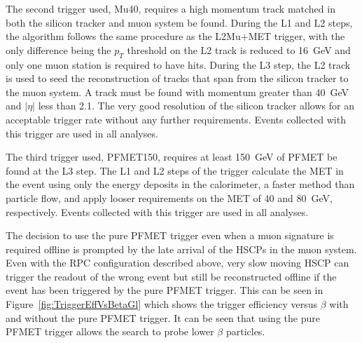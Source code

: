 The second trigger used, Mu40, requires a high momentum track matched in both the silicon tracker and muon system be found.
During the L1 and L2 steps, the algorithm follows the same procedure as the L2Mu+MET trigger, with the only difference being the $p_T$ threshold on the L2 track
is reduced to 16~GeV and only one muon station is required to have hits.
During the L3 step, the L2 track is used to seed the reconstruction of tracks that span from the silicon tracker to the muon system.
A track must be found with momentum greater than 40~GeV and $|\eta|$ less than 2.1. The very good resolution of the silicon tracker allows for an acceptable trigger rate
without any further requirements. Events collected with this trigger are used in all analyses.

The third trigger used, PFMET150, requires at least 150~GeV of PFMET be found at the L3 step. The L1 and L2 steps of the trigger calculate the MET in the event using
only the energy deposits in the calorimeter, a faster method than particle flow, and apply looser requirements on the MET of 40 and 80~GeV, respectively.
Events collected with this trigger are used in all analyses.

The decision to use the pure PFMET trigger even when a muon signature is required offline is prompted by the late arrival of the HSCPs in the muon system.
Even with the RPC configuration described above, very slow moving HSCP can trigger the readout of the wrong event but still be reconstructed offline
if the event has been triggered by the pure PFMET trigger. This can be seen in Figure~\ref{fig:TriggerEffVsBetaGl} which shows the trigger efficiency versus $\beta$
with and without the pure PFMET trigger.
It can be seen that using the pure PFMET trigger allows the search to probe lower $\beta$ particles. 



